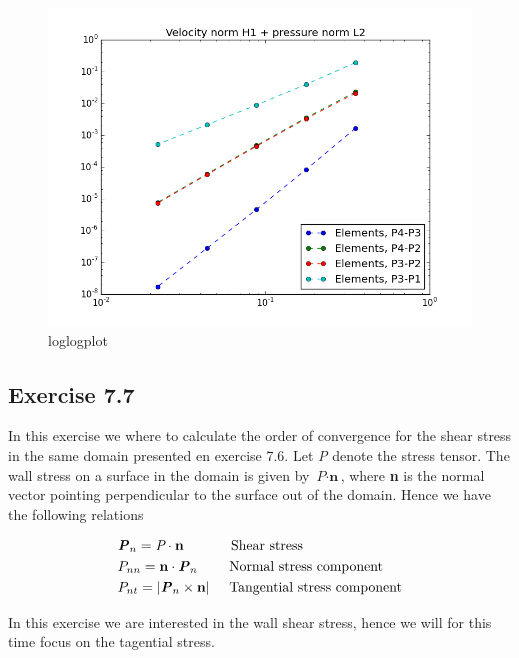 \documentclass[a4paper,norsk]{article}
\begin{document}
\begin{figure}[h!]
	\centering
	\caption*{loglogplot}
	\includegraphics[scale=0.4]{comb.png}
\end{figure}

\newpage
\subsection{Exercise 7.7}
In this exercise we where to calculate the order of convergence for the shear stress in the same domain presented en exercise 7.6.
Let \textit{P} denote the stress tensor. The wall stress on a surface in the domain is given by $\textit{P} \cdot \textbf{n}$, where \textbf{n} is the normal vector 
pointing perpendicular to the surface out of the domain. Hence we have the following relations

\begin{align*}
 &\textbf{\textit{P}}_n = \textit{P} \cdot \textbf{n} \hspace{12mm} \text{Shear stress} \\
	&P_{nn} = \textbf{n} \cdot \textbf{\textit{P}}_n \hspace{8mm} \text{Normal stress component} \\
	&P_{nt} = |\textbf{\textit{P}}_n \times \textbf{n}| \hspace{5mm} \text{Tangential stress component}
	\end{align*}

	In this exercise we are interested in the wall shear stress, hence we will for this time focus on the tagential stress.

	
\end{document}

